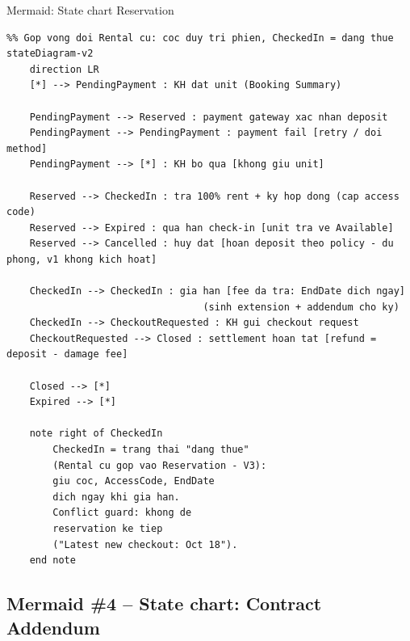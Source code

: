 \documentclass[12pt,a4paper]{article}
\renewcommand{\_}{\textunderscore\allowbreak}
\begin{document}
\begin{mermaidbox}{Mermaid: State chart Reservation}
\begin{Verbatim}[fontsize=\small]
%% StorageHub - State chart: vong doi Reservation (BK-) - V3 2026-09-18
%% Gop vong doi Rental cu: coc duy tri phien, CheckedIn = dang thue
stateDiagram-v2
    direction LR
    [*] --> PendingPayment : KH dat unit (Booking Summary)

    PendingPayment --> Reserved : payment gateway xac nhan deposit
    PendingPayment --> PendingPayment : payment fail [retry / doi method]
    PendingPayment --> [*] : KH bo qua [khong giu unit]

    Reserved --> CheckedIn : tra 100% rent + ky hop dong (cap access code)
    Reserved --> Expired : qua han check-in [unit tra ve Available]
    Reserved --> Cancelled : huy dat [hoan deposit theo policy - du phong, v1 khong kich hoat]

    CheckedIn --> CheckedIn : gia han [fee da tra: EndDate dich ngay]
                                  (sinh extension + addendum cho ky)
    CheckedIn --> CheckoutRequested : KH gui checkout request
    CheckoutRequested --> Closed : settlement hoan tat [refund = deposit - damage fee]

    Closed --> [*]
    Expired --> [*]

    note right of CheckedIn
        CheckedIn = trang thai "dang thue"
        (Rental cu gop vao Reservation - V3):
        giu coc, AccessCode, EndDate
        dich ngay khi gia han.
        Conflict guard: khong de
        reservation ke tiep
        ("Latest new checkout: Oct 18").
    end note
\end{Verbatim}
\end{mermaidbox}

\subsection{Mermaid \#4 -- State chart: Contract Addendum}
\end{document}
